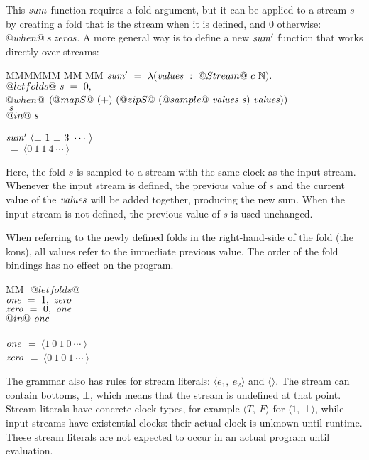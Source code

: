 This $\mathit{sum}$ function requires a fold argument, but it can be applied to a stream $s$ by creating a fold that is the stream when it is defined, and $0$ otherwise: $@when@~s~zeros$.
A more general way is to define a new $\mathit{sum'}$ function that works directly over streams:
\begin{tabbing}
MMMMMM \= MM \= MM \kill
$\mathit{sum'}~=~\lambda{}(\mathit{values}~:~@Stream@~c~\mathbb{N}).$ \\
$@let folds@~\mathit{s}~=~0,$ \\
\> $@when@$ \> $(@mapS@~(+)~(@zipS@~(@sample@~\mathit{values}~\mathit{s})~\mathit{values}))$ \\
\> \> $~\mathit{s}$ \\
$@in@~\mathit{s}$
\\
\\
$\mathit{sum'}~\langle \bot~1~\bot~3~\cdots~\rangle$ \\
$~=~\langle 0~1~1~4~\cdots~\rangle$ \\
\end{tabbing}

Here, the fold $s$ is sampled to a stream with the same clock as the input stream.
Whenever the input stream is defined, the previous value of $s$ and the current value of the $\mathit{values}$ will be added together, producing the new sum.
When the input stream is not defined, the previous value of $s$ is used unchanged.

When referring to the newly defined folds in the right-hand-side of the fold (the kons), all values refer to the immediate previous value.
The order of the fold bindings has no effect on the program.
\begin{tabbing}
MM \= \kill
$@let folds@$ \\
\> $\mathit{one}~=~1,~\mathit{zero}$ \\
\> $\mathit{zero}~=~0,~\mathit{one}$ \\
$@in@~\mathit{one}$
\\
\\
$\mathit{one}$  \> $=~\langle 1~0~1~0~\cdots~\rangle$ \\
$\mathit{zero}$ \> $=~\langle 0~1~0~1~\cdots~\rangle$ \\
\end{tabbing}

The grammar also has rules for stream literals: $\langle e_1,~e_2 \rangle$ and $\langle\rangle$. The stream can contain bottoms, $\bot$, which means that the stream is undefined at that point.
Stream literals have concrete clock types, for example $\langle T,~F \rangle$ for $\langle 1,~\bot \rangle$, while input streams have existential clocks: their actual clock is unknown until runtime.
These stream literals are not expected to occur in an actual program until evaluation.


